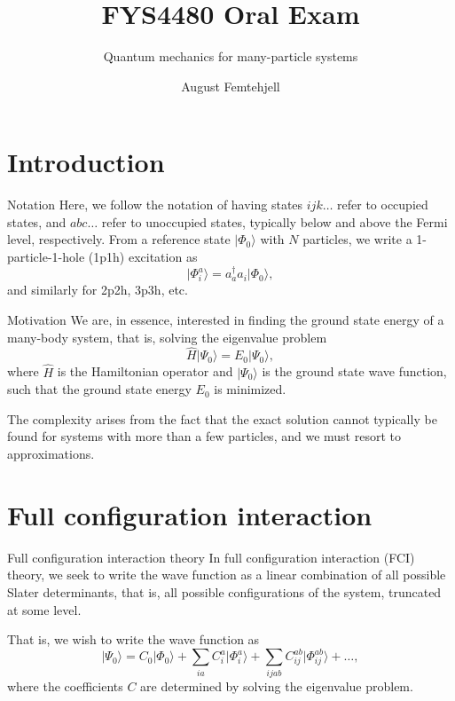 \documentclass[UKenglish,aspectratio=169]{beamer}
\title{FYS4480 Oral Exam}
\subtitle{Quantum mechanics for many-particle systems}
\author{August Femtehjell}
\begin{document}
\uiofrontpage[
    date={16th December, 2024},
]

\section{Introduction}
\begin{frame}{Notation}
    Here, we follow the notation of having states $ijk\ldots$ refer
    to occupied states, and $abc\ldots$ refer to unoccupied states,
    typically below and above the Fermi level, respectively.
    From a reference state $\lvert \Phi_0 \rangle$ with $N$
    particles, we write a 1-particle-1-hole (1p1h) excitation as
    \begin{equation}
        \lvert \Phi_{i}^{a} \rangle
        = a_{a}^\dagger a_{i} \lvert \Phi_0 \rangle,
    \end{equation}
    and similarly for 2p2h, 3p3h, etc.

\end{frame}

\begin{frame}{Motivation}
    We are, in essence, interested in finding the ground state energy
    of a many-body system, that is, solving the eigenvalue problem
    \begin{equation}
        \hat{H} \lvert \Psi_0 \rangle = E_0 \lvert \Psi_0 \rangle,
    \end{equation}
    where $\hat{H}$ is the Hamiltonian operator and $\lvert \Psi_0
    \rangle$ is the ground state wave function, such that the ground
    state energy $E_0$ is minimized.

    \bigskip

    The complexity arises from the fact that the exact solution
    cannot typically be found for systems with more than a few
    particles, and we must resort to approximations.
\end{frame}

\section{Full configuration interaction}

\begin{frame}{Full configuration interaction theory}
    In full configuration interaction (FCI) theory, we seek to write
    the wave function as a linear combination of all possible Slater
    determinants, that is, all possible configurations of the system,
    truncated at some level.

    \bigskip

    That is, we wish to write the wave function as
    \begin{equation}
        \lvert \Psi_0 \rangle
        = C_0 \lvert \Phi_0 \rangle
        + \sum_{ia} C_i^a \lvert \Phi_i^a \rangle
        + \sum_{ijab} C_{ij}^{ab} \lvert \Phi_{ij}^{ab} \rangle
        + \ldots,
    \end{equation}
    where the coefficients $C$ are determined by solving the eigenvalue problem.
\end{frame}
\end{document}
